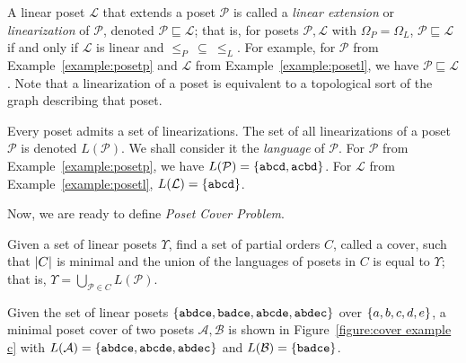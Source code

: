 \documentclass[12pt]{llncs}
\DeclarePairedDelimiter{\set}{\{}{\}}
\DeclarePairedDelimiter{\abs}{\lvert}{\rvert}
\let\oldleq\leq
\renewcommand{\leq}[1][]{\oldleq_{#1}}
\newcommand{\poset}[1]{\mathcal{#1}}
\newcommand{\uni}[1][]{\Omega_{#1}}
\newcommand{\lang}[1]{L(#1)}
\newcommand{\lin}[1]{\texttt{#1}}
\newcommand{\lext}{\sqsubseteq}
\begin{document}
A linear poset $\poset{L}$ that extends a poset $\poset{P}$ is called a \emph{linear extension} or \emph{linearization} of $\poset{P}$, denoted $\poset{P} \lext \poset{L}$; that is, for posets $\poset{P},\poset{L}$ with $\uni[P] \!=\! \uni[L]$, $\poset{P} \lext \poset{L}$ if and only if $\poset{L}$ is linear and $\leq[P] \>\subseteq\> \leq[L]$. For example, for $\poset{P}$ from Example~\ref{example:posetp} and $\poset{L}$ from Example~\ref{example:posetl}, we have $\poset{P} \lext \poset{L}$. Note that a linearization of a poset is equivalent to a topological sort of the graph describing that poset.

Every poset admits a set of linearizations. The set of all linearizations of a poset $\poset{P}$ is denoted $\lang{\poset{P}}$. We shall consider it the \emph{language} of $\poset{P}$. For $\poset{P}$ from Example~\ref{example:posetp}, we have $\lang{\poset{P}} = \set{\lin{abcd},\lin{acbd}}$. For $\poset{L}$ from Example~\ref{example:posetl}, $\lang{\poset{L}} = \set{\lin{abcd}}$.

Now, we are ready to define \emph{Poset Cover Problem}.

\begin{definition}
    Given a set of linear posets $\Upsilon$, find a set of partial orders $C$, called a cover, such that $\abs{C}$ is minimal and the union of the languages of posets in $C$ is equal to $\Upsilon$; that is, $\Upsilon = \bigcup_{\poset{P} \in C} \lang{\poset{P}}$.
    \label{definition:pcp}
\end{definition}

\begin{example}
    Given the set of linear posets $\set{\lin{abdce},\lin{badce},\lin{abcde},\lin{abdec}}$ over $\set{a,b,c,d,e}$, a minimal poset cover of two posets $\poset{A},\poset{B}$ is shown in Figure~\ref{figure:cover example c} with ${\lang{\poset{A}} = \set{\lin{abdce},\lin{abcde},\lin{abdec}}}$ and ${\lang{\poset{B}} = \set{\lin{badce}}}$.
    \label{example:cover example}
\end{example}
\end{document}
